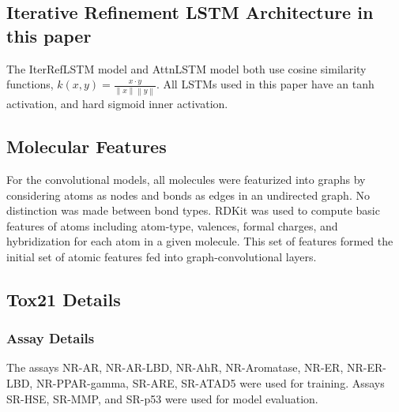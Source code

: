 \documentclass[journal=jacsat,manuscript=article]{achemso}
\begin{document}
\subsection{Iterative Refinement LSTM Architecture in this paper}

The IterRefLSTM model and AttnLSTM model both use cosine similarity functions, $k(x,y) = \frac{x\cdot y}{ \left\|x\right\|\left\|y\right\|}$. All LSTMs used in this paper have an tanh activation, and hard sigmoid inner activation.

\subsection{Molecular Features}

For the convolutional models, all molecules were featurized into graphs by considering atoms as nodes and bonds as edges in an undirected graph. No distinction was made between bond types. RDKit \cite{landrum2016} was used to compute basic features of atoms including atom-type, valences, formal charges, and hybridization for each atom in a given molecule. This set  of features formed the initial set of atomic features fed into graph-convolutional layers. 

\subsection{Tox21 Details}

\subsubsection{Assay Details}
The assays NR-AR, NR-AR-LBD, NR-AhR, NR-Aromatase, NR-ER, NR-ER-LBD, NR-PPAR-gamma, SR-ARE, SR-ATAD5 were used for training. Assays SR-HSE, SR-MMP, and SR-p53 were used for model evaluation.
\end{document}
